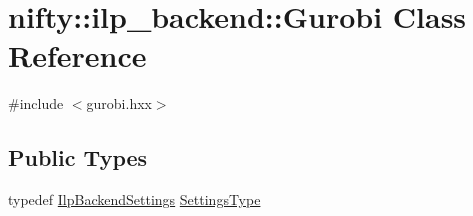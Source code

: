 \hypertarget{classnifty_1_1ilp__backend_1_1Gurobi}{}\section{nifty\+:\+:ilp\+\_\+backend\+:\+:Gurobi Class Reference}
\label{classnifty_1_1ilp__backend_1_1Gurobi}


{\ttfamily \#include $<$gurobi.\+hxx$>$}

\subsection*{Public Types}
\begin{DoxyCompactItemize}
\item 
typedef \hyperlink{structnifty_1_1ilp__backend_1_1IlpBackendSettings}{Ilp\+Backend\+Settings} \hyperlink{classnifty_1_1ilp__backend_1_1Gurobi_a452f0f9dbcdf6bf9741607e9561fa3c5}{Settings\+Type}
\end{DoxyCompactItemize}
